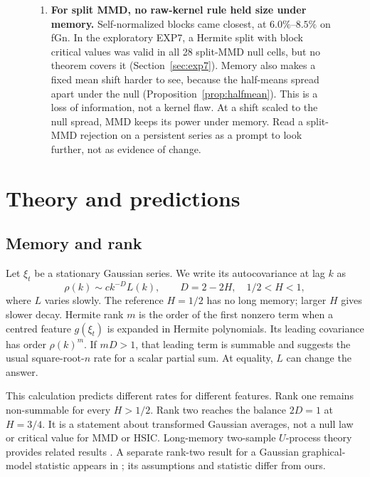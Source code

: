 \documentclass[11pt]{article}
\theoremstyle{remark}
\begin{document}
\begin{figure}[H]
{\begin{minipage}{0.94\linewidth}
\begin{enumerate}[leftmargin=*,itemsep=2pt]
\item \textbf{For split MMD, no raw-kernel rule held size under memory.} Self-normalized blocks came closest, at $6.0\%$--$8.5\%$ on fGn. In the exploratory EXP7, a Hermite split with block critical values was valid in all 28 split-MMD null cells, but no theorem covers it (Section~\ref{sec:exp7}). Memory also makes a fixed mean shift harder to see, because the half-means spread apart under the null (Proposition~\ref{prop:halfmean}). This is a loss of information, not a kernel flaw. At a shift scaled to the null spread, MMD keeps its power under memory. Read a split-MMD rejection on a persistent series as a prompt to look further, not as evidence of change.
\end{enumerate}
\end{minipage}}
\end{figure}

\section{Theory and predictions}\label{sec:theory}
\subsection{Memory and rank}
Let $\xi_t$ be a stationary Gaussian series. We write its autocovariance at lag $k$ as
\begin{equation}\label{eq:memory}
\rho(k) \sim c k^{-D}L(k),\qquad D=2-2H,\quad 1/2<H<1,
\end{equation}
where $L$ varies slowly. The reference $H=1/2$ has no long memory; larger $H$ gives slower decay. Hermite rank $m$ is the order of the first nonzero term when a centred feature $g(\xi_t)$ is expanded in Hermite polynomials. Its leading covariance has order $\rho(k)^m$. If $mD>1$, that leading term is summable and suggests the usual square-root-$n$ rate for a scalar partial sum. At equality, $L$ can change the answer.

This calculation predicts different rates for different features. Rank one remains non-summable for every $H>1/2$. Rank two reaches the balance $2D=1$ at $H=3/4$. It is a statement about transformed Gaussian averages, not a null law or critical value for MMD or HSIC. Long-memory two-sample $U$-process theory provides related results \citep{dehling2017twosample}. A separate rank-two result for a Gaussian graphical-model statistic appears in \citet{zhai2026ggmlong}; its assumptions and statistic differ from ours.
\end{document}

